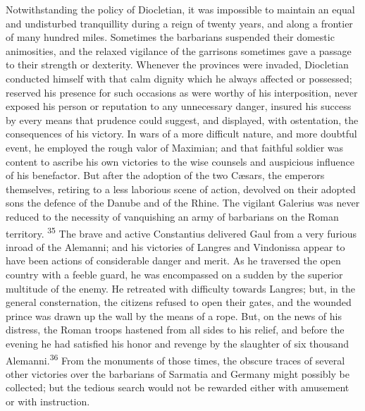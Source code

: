 Notwithstanding the policy of Diocletian, it was impossible to
maintain an equal and undisturbed tranquillity during a reign of
twenty years, and along a frontier of many hundred miles.
Sometimes the barbarians suspended their domestic animosities,
and the relaxed vigilance of the garrisons sometimes gave a
passage to their strength or dexterity. Whenever the provinces
were invaded, Diocletian conducted himself with that calm dignity
which he always affected or possessed; reserved his presence for
such occasions as were worthy of his interposition, never exposed
his person or reputation to any unnecessary danger, insured his
success by every means that prudence could suggest, and
displayed, with ostentation, the consequences of his victory. In
wars of a more difficult nature, and more doubtful event, he
employed the rough valor of Maximian; and that faithful soldier
was content to ascribe his own victories to the wise counsels and
auspicious influence of his benefactor. But after the adoption of
the two Cæsars, the emperors themselves, retiring to a less
laborious scene of action, devolved on their adopted sons the
defence of the Danube and of the Rhine. The vigilant Galerius was
never reduced to the necessity of vanquishing an army of
barbarians on the Roman territory. \textsuperscript{35} The brave and active
Constantius delivered Gaul from a very furious inroad of the
Alemanni; and his victories of Langres and Vindonissa appear to
have been actions of considerable danger and merit. As he
traversed the open country with a feeble guard, he was
encompassed on a sudden by the superior multitude of the enemy.
He retreated with difficulty towards Langres; but, in the general
consternation, the citizens refused to open their gates, and the
wounded prince was drawn up the wall by the means of a rope. But,
on the news of his distress, the Roman troops hastened from all
sides to his relief, and before the evening he had satisfied his
honor and revenge by the slaughter of six thousand Alemanni.\textsuperscript{36}
From the monuments of those times, the obscure traces of several
other victories over the barbarians of Sarmatia and Germany might
possibly be collected; but the tedious search would not be
rewarded either with amusement or with instruction.



